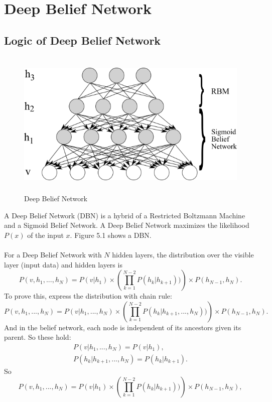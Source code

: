 \documentclass[12pt]{article}
\begin{document}
\section{Deep Belief Network}
\subsection{Logic of Deep Belief Network}
\begin{figure}[h]
\centering
\includegraphics[height=2.8in]{DBN.png}
\caption{Deep Belief Network} \label{fig:side:a}
\end{figure}
A Deep Belief Network (DBN) is a hybrid of a Restricted Boltzmann Machine and a Sigmoid Belief Network. A Deep Belief Network maximizes the likelihood $P(x)$ of the input $x$. Figure 5.1 shows a DBN.\\
\\
For a Deep Belief Network with $N$ hidden layers, the distribution over the visible layer (input data) and hidden layers is\begin{equation}
P(v, h_1, ..., h_N)  = P(v| h_1) \times\left(\prod_{k=1}^{N-2}  P(h_k| h_{k+1}))\right)\times P(h_{N-1},h_N).
\end{equation}
To prove this, express the distribution with chain rule:\begin{equation}
P(v, h_1, ..., h_N)  = P(v| h_1, ..., h_N) \times\left(\prod_{k=1}^{N-2}  P(h_k| h_{k+1},..., h_{N}))\right)\times P(h_{N-1},h_N).
\end{equation}
And in the belief network, each node is independent of its ancestors given its parent. So these hold:\begin{gather}
P(v| h_1, ..., h_N) = P(v|h_1),\\
P(h_k| h_{k+1},..., h_{N}) = P(h_k| h_{k+1}).
\end{gather}
So \begin{equation}
P(v, h_1, ..., h_N)  = P(v| h_1) \times\left(\prod_{k=1}^{N-2}  P(h_k| h_{k+1}))\right)\times P(h_{N-1},h_N),
\end{equation}
\end{document}

